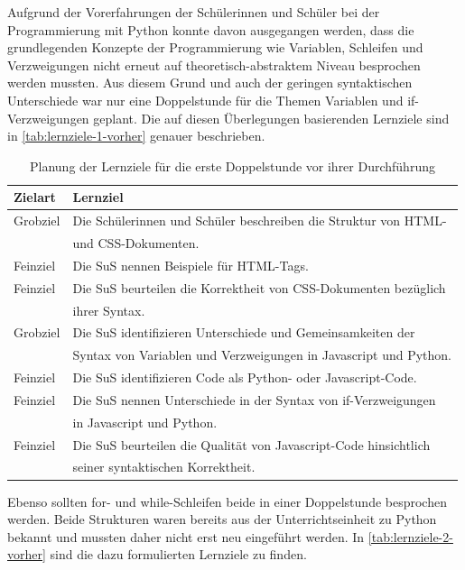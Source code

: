 Aufgrund der Vorerfahrungen der Schülerinnen und Schüler bei der Programmierung mit Python konnte davon ausgegangen werden, dass die grundlegenden Konzepte der Programmierung wie Variablen, Schleifen und Verzweigungen nicht erneut auf theoretisch-abstraktem Niveau besprochen werden mussten.
Aus diesem Grund und auch der geringen syntaktischen Unterschiede war nur eine Doppelstunde für die Themen Variablen und if-Verzweigungen geplant.
Die auf diesen Überlegungen basierenden Lernziele sind in \autoref{tab:lernziele-1-vorher} genauer beschrieben.

\begin{table}[h!]
\begin{tabular*}{\linewidth}{l|l}
	\hline
	\textbf{Zielart} & \textbf{Lernziel}\\
	\hline \hline
	Grobziel & Die Schülerinnen und Schüler beschreiben die Struktur von HTML-\\
	& und CSS-Dokumenten.\\
	Feinziel & Die SuS nennen Beispiele für HTML-Tags.\\
	Feinziel & Die SuS beurteilen die Korrektheit von CSS-Dokumenten bezüglich\\
	& ihrer Syntax.\\
	Grobziel & Die SuS identifizieren Unterschiede und Gemeinsamkeiten der\\
	& Syntax von Variablen und Verzweigungen in Javascript und Python.\\
	Feinziel & Die SuS identifizieren Code als Python- oder Javascript-Code.\\
	Feinziel & Die SuS nennen Unterschiede in der Syntax von if-Verzweigungen\\
	& in Javascript und Python.\\
	Feinziel & Die SuS beurteilen die Qualität von Javascript-Code hinsichtlich\\
	& seiner syntaktischen Korrektheit.\\
	\hline
\end{tabular*}
\caption{Planung der Lernziele für die erste Doppelstunde vor ihrer Durchführung}
\label{tab:lernziele-1-vorher}
\end{table}

Ebenso sollten for- und while-Schleifen beide in einer Doppelstunde besprochen werden.
Beide Strukturen waren bereits aus der Unterrichtseinheit zu Python bekannt und mussten daher nicht erst neu eingeführt werden.
In \autoref{tab:lernziele-2-vorher} sind die dazu formulierten Lernziele zu finden.

